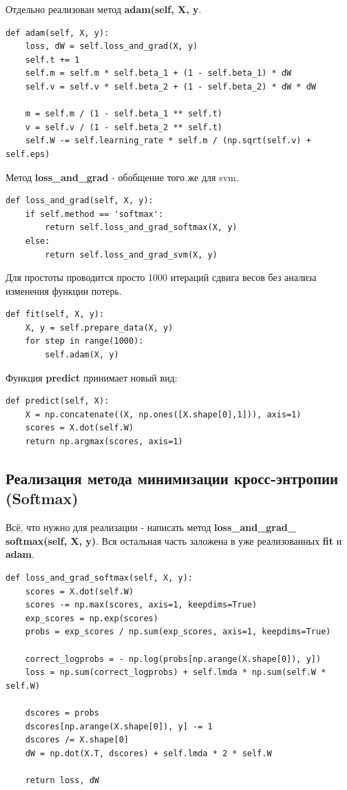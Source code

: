 \documentclass[a4paper]{article}
\begin{document}
Отдельно реализован метод \textbf{adam(self, X, y}. 
\begin{lstlisting}
def adam(self, X, y):
	loss, dW = self.loss_and_grad(X, y)
	self.t += 1
	self.m = self.m * self.beta_1 + (1 - self.beta_1) * dW
	self.v = self.v * self.beta_2 + (1 - self.beta_2) * dW * dW
        
	m = self.m / (1 - self.beta_1 ** self.t)
	v = self.v / (1 - self.beta_2 ** self.t)
	self.W -= self.learning_rate * self.m / (np.sqrt(self.v) + self.eps)
\end{lstlisting}

Метод \textbf{loss\_and\_grad} - обобщение того же для svm.
\begin{lstlisting}
def loss_and_grad(self, X, y):
	if self.method == 'softmax':
		return self.loss_and_grad_softmax(X, y)
	else:
		return self.loss_and_grad_svm(X, y)
\end{lstlisting}

Для простоты проводится просто 1000 итераций сдвига весов без анализа изменения функции потерь.
\begin{lstlisting}
def fit(self, X, y):
	X, y = self.prepare_data(X, y)
	for step in range(1000):
		self.adam(X, y)
\end{lstlisting}

Функция \textbf{predict} принимает новый вид:
\begin{lstlisting}
def predict(self, X):
	X = np.concatenate((X, np.ones([X.shape[0],1])), axis=1)
	scores = X.dot(self.W)
	return np.argmax(scores, axis=1)
\end{lstlisting}

\subsection{Реализация метода минимизации кросс-энтропии (Softmax)}

Всё, что нужно для реализации - написать метод \textbf{loss\_and\_grad\_ softmax(self, X, y)}. Вся остальная часть заложена в уже реализованных \textbf{fit} и \textbf{adam}. 
\begin{lstlisting}
def loss_and_grad_softmax(self, X, y):
	scores = X.dot(self.W)
	scores -= np.max(scores, axis=1, keepdims=True)
	exp_scores = np.exp(scores)
	probs = exp_scores / np.sum(exp_scores, axis=1, keepdims=True)
	
	correct_logprobs = - np.log(probs[np.arange(X.shape[0]), y])
	loss = np.sum(correct_logprobs) + self.lmda * np.sum(self.W * self.W)
        
	dscores = probs
	dscores[np.arange(X.shape[0]), y] -= 1
	dscores /= X.shape[0]
	dW = np.dot(X.T, dscores) + self.lmda * 2 * self.W
        
	return loss, dW
\end{lstlisting}
\end{document}
